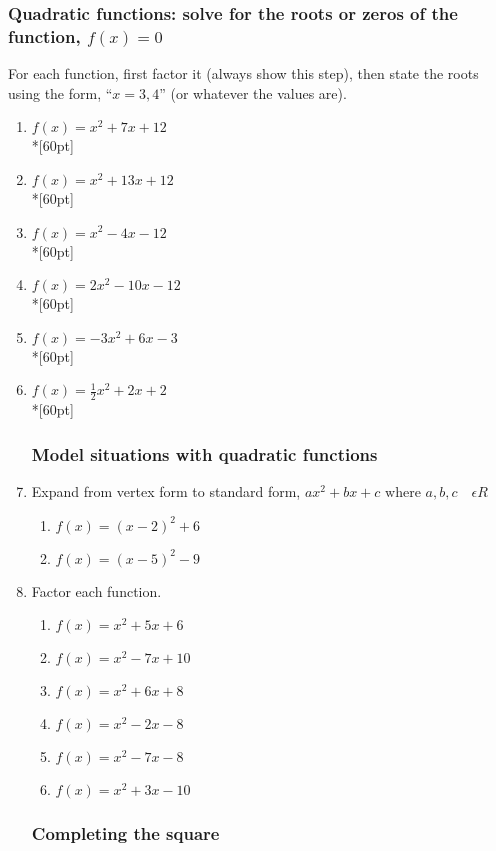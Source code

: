 \documentclass[12pt, oneside]{article}
\begin{document}
\subsubsection*{Quadratic functions: solve for the roots or zeros of the function, $f(x)=0$}

For each function, first factor it (always show this step), then state the roots using the form, ``$x=3,4$'' (or whatever the values are).

\begin{enumerate}

\item   $f(x)=x^2+7x+12$\\*[60pt]
\item   $f(x)=x^2+13x+12$\\*[60pt]
\item   $f(x)=x^2-4x-12$\\*[60pt]
\item   $f(x)=2x^2-10x-12$\\*[60pt]
\item   $f(x)=-3x^2+6x-3$\\*[60pt]
\item   $f(x)=\frac{1}{2}x^2+2x+2$\\*[60pt]

\newpage
\subsubsection*{Model situations with quadratic functions}
\item Expand from vertex form to standard form, $ax^2+bx+c \text{ where } a, b, c \quad  \epsilon R$
\begin{enumerate}
  \item   $f(x)=(x-2)^2+6$
  \item   $f(x)=(x-5)^2-9$
\end{enumerate}

\item Factor each function.
\begin{enumerate}
\item   $f(x)=x^2+5x+6$
\item   $f(x)=x^2-7x+10$
\item   $f(x)=x^2+6x+8$
\item   $f(x)=x^2-2x-8$
\item   $f(x)=x^2-7x-8$
\item   $f(x)=x^2+3x-10$
\end{enumerate}

\subsubsection*{Completing the square}


\end{enumerate}
\end{document}
